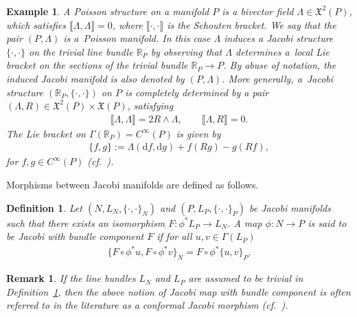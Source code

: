 \documentclass[pdftex]{sigma}
\numberwithin{equation}{section}
\newtheorem{Definition}[Theorem]{Definition}
\newtheorem{Example}[Theorem]{Example}
\newtheorem{Remark}[Theorem]{Remark} }
\newcommand{\X}{\ensuremath{\mathfrak{X}}}
\newcommand{\de}{\mathrm{d}} %
\newcommand{\RR}{\mathbb{R}}
\begin{document}
\begin{Example}\label{obs:kir} A {\it Poisson structure} on a manifold $P$ is a bivector f\/ield $\Lambda \in \X^2(P)$, which satisf\/ies $\llbracket \Lambda,\Lambda \rrbracket=0$, where $\llbracket \cdot, \cdot \rrbracket$ is the Schouten bracket. We say that the pair $(P,\Lambda)$ is a~{\it Poisson manifold}. In this case $\Lambda$ induces a Jacobi structure $\{\cdot,\cdot\}$ on the trivial line bundle $\RR_P$ by observing that $\Lambda$ determines a~local Lie bracket on the sections of the trivial bundle $\RR_P \to P$. By abuse of notation, the induced Jacobi manifold is also
denoted by $(P,\Lambda)$. More generally, a~Jacobi structure $(\RR_P,\{\cdot, \cdot\})$ on $P$ is completely determined by a pair
$(\Lambda, R) \in \X^2(P) \times \X(P)$, satisfying
\begin{gather*} %
 \llbracket \Lambda,\Lambda \rrbracket =2R\wedge\Lambda,\qquad \llbracket \Lambda,R \rrbracket=0.
\end{gather*}
The Lie bracket on $\Gamma(\RR_P) = C^{\infty}(P)$ is given by
\begin{gather*}
 \{f,g\} := \Lambda(\de f, \de g) + f (Rg) - g(Rf),
\end{gather*}
for $f,g \in C^{\infty}(P)$ (cf.~\cite{Lich78}).
\end{Example}

Morphisms between Jacobi manifolds are def\/ined as follows.

\begin{Definition}\label{defn:jacobi_maps}
 Let $(N, L_N,\{\cdot,\cdot\}_N)$ and $(P, L_P, \{\cdot,\cdot\}_P)$ be Jacobi manifolds such that there exists an isomorphism $F\colon \phi^*L_P \to
 L_N$. A map $\phi \colon N \to P$ is said to be {\it Jacobi} with {\it bundle component} $F$ if for all $u,v \in \Gamma(L_P)$
 \begin{gather*}
 \{F \circ \phi^*u, F \circ \phi^*v\}_N = F \circ \phi^*\{u,v\}_P.
 \end{gather*}
\end{Definition}

\begin{Remark}
 If the line bundles $L_N$ and $L_P$ are assumed to be trivial in Def\/inition~\ref{defn:jacobi_maps}, then the above notion of Jacobi map with bundle component is often referred to in the literature as a {\em conformal} Jacobi morphism (cf.\ \cite[Section~1.6]{Dazord-Lich-Marle91}).
\end{Remark}
\end{document}
